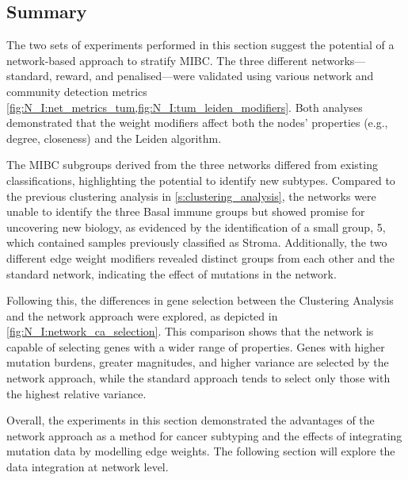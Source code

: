 \subsection{Summary}

The two sets of experiments performed in this section suggest the potential of a network-based approach to stratify MIBC. The three different networks—standard, reward, and penalised—were validated using various network and community detection metrics \cref{fig:N_I:net_metrics_tum,fig:N_I:tum_leiden_modifiers}. Both analyses demonstrated that the weight modifiers affect both the nodes' properties (e.g., degree, closeness) and the Leiden algorithm.

The MIBC subgroups derived from the three networks differed from existing classifications, highlighting the potential to identify new subtypes. Compared to the previous clustering analysis in \cref{s:clustering_analysis}, the networks were unable to identify the three Basal immune groups but showed promise for uncovering new biology, as evidenced by the identification of a small group, 5, which contained samples previously classified as Stroma. Additionally, the two different edge weight modifiers revealed distinct groups from each other and the standard network, indicating the effect of mutations in the network.

Following this, the differences in gene selection between the Clustering Analysis and the network approach were explored, as depicted in \cref{fig:N_I:network_ca_selection}. This comparison shows that the network is capable of selecting genes with a wider range of properties. Genes with higher mutation burdens, greater magnitudes, and higher variance are selected by the network approach, while the standard approach tends to select only those with the highest relative variance.

Overall, the experiments in this section demonstrated the advantages of the network approach as a method for cancer subtyping and the effects of integrating mutation data by modelling edge weights. The following section will explore the data integration at network level.
